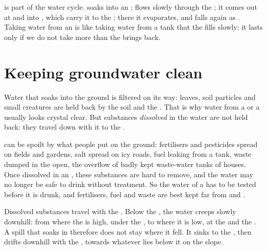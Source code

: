  is part of the water cycle.  soaks into an ;
 flows slowly through the ; it comes out at  and into , which carry it to the ; there
it evaporates, and falls again as . Taking water from an  is like
taking water from a tank that the  fills slowly: it lasts only if we do
not take more than the  brings back.

\section{Keeping groundwater clean}

Water that soaks into the ground is filtered on its way: leaves, soil
particles and small creatures are held back by the soil and the . That
is why water from a  or a  usually looks crystal clear. But
substances \emph{dissolved} in the water are not held back: they travel
down with it to the .

 can be spoilt by what people put on the ground: fertilisers and
pesticides spread on fields and gardens, salt spread on icy roads, fuel
leaking from a tank, waste dumped in the open, the overflow of badly kept
waste-water tanks of houses. Once dissolved in an , these substances
are hard to remove, and the water may no longer be safe to drink without
treatment. So the water of a  has to be tested before it is drunk, and fertilisers, fuel and waste are best kept far from  and .

Dissolved substances travel with the . Below the ,
the water creeps slowly downhill: from where the  is high, under
the , to where it is low, at the  and the . A spill that
soaks in therefore does not stay where it fell. It sinks to the , then drifts downhill with the , towards whatever lies
below it on the slope.

